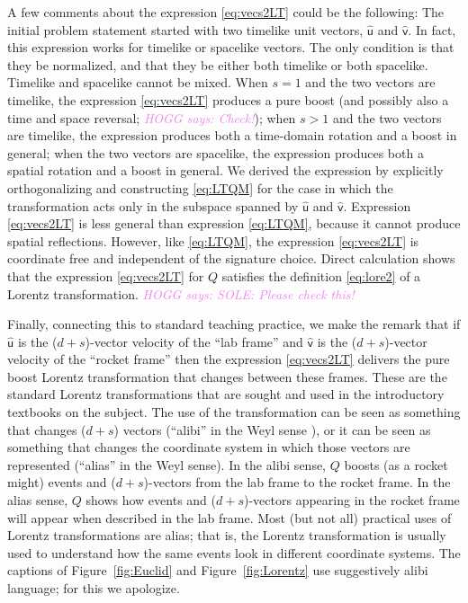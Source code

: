 \documentclass{article}
\newcommand{\Lhat}[1]{\hat{\mathsf{#1}}} %
\newcommand{\plus}{\!+\!} %
\newcommand{\figref}[1]{Figure~\ref{#1}}
\newcommand{\HOGG}[1]{\textcolor{violet}{\textsl{HOGG says: {#1}}}}
\begin{document}
A few comments about the expression \eqref{eq:vecs2LT} could be the following:
The initial problem statement started with two timelike unit vectors, $\Lhat{u}$ and $\Lhat{v}$.
In fact, this expression works for timelike or spacelike vectors.
The only condition is that they be normalized, and that they be either both timelike or both spacelike.
Timelike and spacelike cannot be mixed.
When $s=1$ and the two vectors are timelike, the expression \eqref{eq:vecs2LT} produces a pure boost (and possibly also a time 
and space reversal; \HOGG{Check!});
when $s>1$ and the two vectors are timelike, the expression produces both a time-domain rotation and a boost in general;
when the two vectors are spacelike, the expression produces both a spatial rotation and a boost in general.
We derived the expression by explicitly orthogonalizing and constructing \eqref{eq:LTQM} for the case in which the transformation acts only in the subspace spanned by $\Lhat{u}$ and $\Lhat{v}$.
Expression \eqref{eq:vecs2LT} is less general than expression \eqref{eq:LTQM}, because it cannot produce spatial reflections.
However, like \eqref{eq:LTQM}, the expression \eqref{eq:vecs2LT} is coordinate free and independent of the signature choice.
Direct calculation shows that the expression \eqref{eq:vecs2LT} for $Q$ satisfies the definition \eqref{eq:lore2} of a Lorentz transformation.
\HOGG{SOLE: Please check this!}

Finally, connecting this to standard teaching practice, we make the remark that if $\Lhat{u}$ is the ($d\plus s$)-vector velocity of the ``lab frame'' and $\Lhat{v}$ is the ($d\plus s$)-vector velocity of the ``rocket frame'' then the expression \eqref{eq:vecs2LT} delivers the pure boost Lorentz transformation that changes between these frames.
These are the standard Lorentz transformations that are sought and used in the introductory textbooks on the subject.
The use of the transformation can be seen as something that changes ($d\plus s$) vectors (``alibi'' in the Weyl sense \cite{weyl}),
or it can be seen as something that changes the coordinate system in which those vectors are represented (``alias'' in the Weyl sense).
In the alibi sense, $Q$ boosts (as a rocket might) events and ($d\plus s$)-vectors from the lab frame to the rocket frame.
In the alias sense, $Q$ shows how events and ($d\plus s$)-vectors appearing in the rocket frame will appear when described in the lab frame.
Most (but not all) practical uses of Lorentz transformations are alias;
that is, the Lorentz transformation is usually used to understand how the same events look in different coordinate systems.
The captions of \figref{fig:Euclid} and \figref{fig:Lorentz} use suggestively alibi language; for this we apologize.
\end{document}

